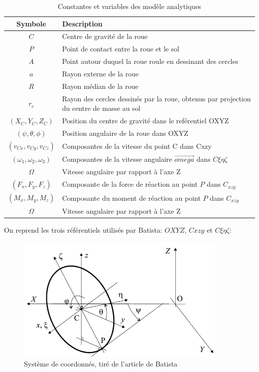 \begin{table}[htbp]
  \centering
  \caption{Constantes et variables des modèle analytiques}
  \begin{tabular}{|c|l|}
    \hline\rowcolor[gray]{0.8}\color{black}
    Symbole         & Description\\\hline
    $C$             & Centre de gravité de la roue\\\hline
    $P$             & Point de contact entre la roue et le sol\\\hline
    $A$             & Point autour duquel la roue roule en dessinant des cercles\\\hline
    $a$             & Rayon externe de la roue\\\hline
    $R$             & Rayon médian de la roue\\\hline
    $r_c$             & Rayon des cercles dessinés par la roue, obtenus par projection du centre de masse au sol\\\hline
    $(X_C,Y_C,Z_C)$           & Position du centre de gravité dans le reférentiel OXYZ\\\hline
    $(\psi,\theta,\phi)$       & Position angulaire de la roue dans OXYZ\\\hline
    $(v_{Cx},v_{Cy},v_{Cz})$           & Composantes de la vitesse du point C dans C{xzy} \\\hline
    $(\omega_1,\omega_2,\omega_3)$          & Composantes de la vitesse angulaire $\vec{omega}$ dans $C{\xi \eta \zeta}$\\\hline
    $\Omega$          & Vitesse angulaire par rapport à l'axe Z\\\hline
    $(F_x,F_y,F_z)$          & Composante de la force de réaction au point $P$ dans $C_{xzy}$ \\\hline
    $(M_x,M_y,M_z)$          & Composante du moment de réaction au point $P$ dans $C_{xzy}$ \\\hline
    $\Omega$          & Vitesse angulaire par rapport à l'axe Z\\\hline
  \end{tabular}
  \label{tab:batista}
\end{table}

On reprend les trois référentiels utilisés par Batista: $OXYZ$, $C{xzy}$ et $C{\xi\eta\zeta}$:

\begin{figure}[htb]
\centering
\includegraphics[width=4in]{batista/ref1.png}
\caption{Système de coordonnés, tiré de l'article de Batista \cite{Batista}}
\label{fig:ref1}
\end{figure}

